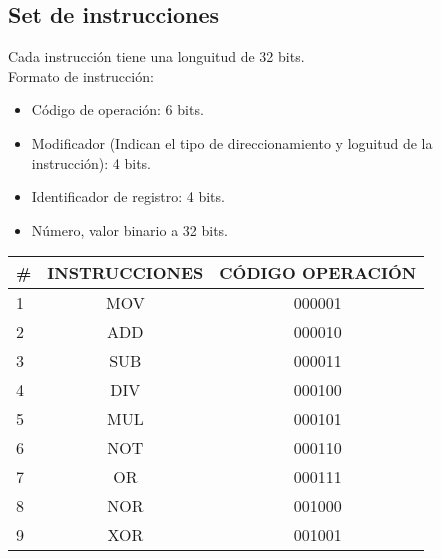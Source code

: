 \documentclass[conference]{IEEEtran}
\begin{document}
\subsection{Set de instrucciones}
Cada instrucción tiene una longuitud de 32 bits.\\
Formato de instrucción:
\begin{itemize}
    \item Código de operación: 6 bits.
    \item Modificador (Indican el tipo de direccionamiento y loguitud de la instrucción): 4 bits.
    \item Identificador de registro: 4 bits.
    \item Número, valor binario a 32 bits.
\end{itemize}

\begin{table}[h]
    \begin{tabular}{|l|c|c|}
    \hline
    \multicolumn{1}{|c|}{\#} & {INSTRUCCIONES} & {CÓDIGO   OPERACIÓN} \\ \hline
    1                                           & MOV                               & 000001                                 \\ \hline
    2                                           & ADD                               & 000010                                 \\ \hline
    3                                           & SUB                               & 000011                                 \\ \hline
    4                                           & DIV                               & 000100                                 \\ \hline
    5                                           & MUL                               & 000101                                 \\ \hline
    6                                           & NOT                               & 000110                                 \\ \hline
    7                                           & OR                                & 000111                                 \\ \hline
    8                                           & NOR                               & 001000                                 \\ \hline
    9                                           & XOR                               & 001001                                 \\ \hline

\end{tabular}
\end{table}
\end{document}
